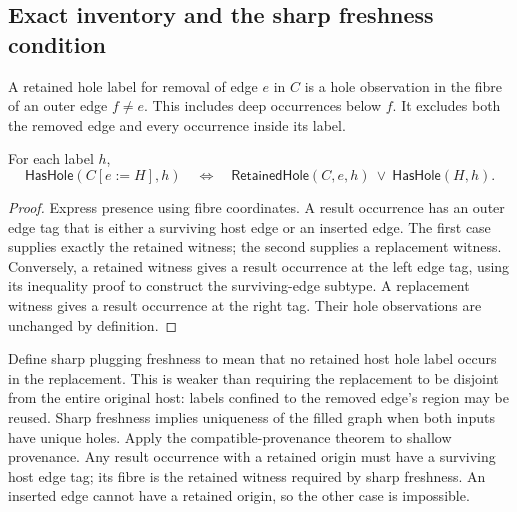 \subsection{Exact inventory and the sharp freshness condition}
\begin{definition}\label{term:retained}
A retained hole label for removal of edge $e$ in $C$ is a hole observation in the
fibre of an outer edge $f\ne e$. This includes deep occurrences below $f$.
It excludes both the removed edge and every occurrence inside its label.
\end{definition}
\begin{theorem}
For each label $h$,
\[
 \mathsf{HasHole}(C[e:=H],h)
 \quad\Longleftrightarrow\quad
 \mathsf{RetainedHole}(C,e,h)\ \lor\ \mathsf{HasHole}(H,h).
\]
\end{theorem}
\begin{proof}
Express presence using fibre coordinates. A result occurrence has an outer edge
tag that is either a surviving host edge or an inserted edge. The first case
supplies exactly the retained witness; the second supplies a replacement witness.
Conversely, a retained witness gives a result occurrence at the left edge tag,
using its inequality proof to construct the surviving-edge subtype. A replacement
witness gives a result occurrence at the right tag. Their hole observations
are unchanged by definition.
\end{proof}

Define sharp plugging freshness to mean that no retained host hole label occurs
in the replacement. This is weaker than requiring the replacement to be disjoint
from the entire original host: labels confined to the removed edge's region may
be reused.
Sharp freshness implies uniqueness of the filled graph when both inputs have
unique holes. Apply the compatible-provenance theorem to shallow provenance.
Any result occurrence with a retained origin must have a surviving host edge
tag; its fibre is the retained witness required by sharp freshness. An inserted
edge cannot have a retained origin, so the other case is impossible.

